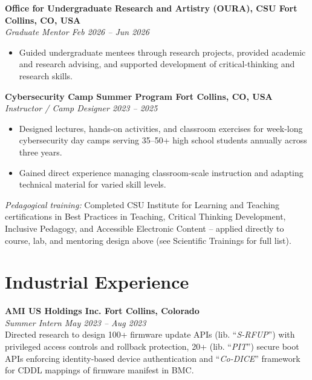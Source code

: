 \documentclass[11pt, a4paper]{article}
\begin{document}
\medskip
{\fontsize{10.87}{13.5}\selectfont
\textbf{\color{cvred} Office for Undergraduate Research and Artistry (OURA), CSU \hfill Fort Collins, CO, USA}\\
\textit{Graduate Mentor \hfill Feb 2026 -- Jun 2026}

\begin{itemize}[leftmargin=*, itemsep=2pt, topsep=2pt]
  \item Guided undergraduate mentees through research projects, provided academic and research advising, and supported development of critical-thinking and research skills.
\end{itemize}
}

\medskip
{\fontsize{10.87}{13.5}\selectfont
\textbf{\color{cvred} Cybersecurity Camp Summer Program \hfill Fort Collins, CO, USA}\\
\textit{Instructor / Camp Designer \hfill 2023 -- 2025}

\begin{itemize}[leftmargin=*, itemsep=2pt, topsep=2pt]
  \item Designed lectures, hands-on activities, and classroom exercises for week-long cybersecurity day camps serving 35--50+ high school students annually across three years.
  \item Gained direct experience managing classroom-scale instruction and adapting technical material for varied skill levels.
\end{itemize}
}

\medskip
{\fontsize{10.87}{13.5}\selectfont
\textit{Pedagogical training:} Completed CSU Institute for Learning and Teaching certifications in Best Practices in Teaching, Critical Thinking Development, Inclusive Pedagogy, and Accessible Electronic Content -- applied directly to course, lab, and mentoring design above (see Scientific Trainings for full list).
}

\section{Industrial Experience}

\medskip
{\fontsize{10.87}{13.5}\selectfont
\textbf{\color{cvred} AMI US Holdings Inc. \hfill Fort Collins, Colorado}\\
\textit{Summer Intern \hfill May 2023 -- Aug 2023} \\
Directed research to design 100+ firmware update APIs (lib. ``\textit{S-RFUP}'') with privileged access controls and rollback protection, 20+ (lib. ``\textit{PIT}'') secure boot APIs enforcing identity-based device authentication and ``\textit{Co-DICE}'' framework for CDDL mappings of firmware manifest in BMC.
}
\end{document}
